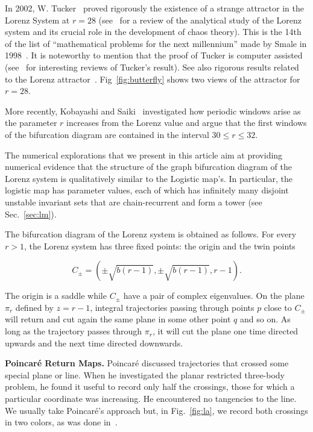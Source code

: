 \documentclass{article}
\def\rhoo{r}
\def\betaa{b}
\newcommand{\beq}{\begin{linenomath}\begin{equation}} %
\newcommand{\eeq}{\end{equation}\end{linenomath}} %
\begin{document}
In 2002, W. Tucker~\cite{Tuc02} proved  rigorously the existence of a strange attractor in the Lorenz System at $r=28$ (see~\cite{Ghy13} for a review of the analytical study of the Lorenz system and its crucial role in the development of chaos theory). 
This is the 14th of the list of  ``mathematical problems for the next millennium'' made by Smale in 1998~\cite{Sma98}. It is noteworthy to mention that the proof of Tucker is computer assisted (see~\cite{Ste00,Via00} for interesting reviews of Tucker's result).
See also rigorous results related to the Lorenz attractor~\cite{Rue76,Ran78,GW79,Wil79}. 
Fig~\ref{fig:butterfly} shows two views of the attractor for $r=28$.

More recently, Kobayashi and Saiki~\cite{KS10,KS14} investigated how periodic windows arise as the parameter $\rhoo$ increases from the Lorenz value and argue that the first windows of the bifurcation diagram are contained in the interval $30\leq\rhoo\leq32$.


The numerical explorations that we present in this article aim at providing numerical evidence that the structure of the graph bifurcation diagram of the Lorenz system is qualitatively similar to the Logistic map's. 
In particular, the logistic map has parameter values, each of which has infinitely many disjoint unstable invariant sets that are chain-recurrent and form a tower (see Sec.~\ref{sec:lm}). 



The bifurcation diagram of the Lorenz system is obtained as follows. For every $\rhoo>1$, the Lorenz system has three fixed points: the origin and the twin points 
\beq
\label{eq:ss}
C_\pm=\left(\pm\sqrt{\betaa(\rhoo-1)},\pm\sqrt{\betaa(\rhoo-1)},\rhoo-1\right).
\eeq
The origin is a saddle while $C_\pm$ have a pair of complex eigenvalues.
On the plane $\pi_\rhoo$ defined by $z=\rhoo-1$, integral trajectories passing through points $p$ close to $C_\pm$ will return and cut again the same plane in some other point $q$ and so on. 
As long as the trajectory passes through  $\pi_\rhoo$, it will cut the plane one time directed upwards and the next time directed downwards. 

{\bf Poincar\'e Return Maps.} 
Poincar\'e discussed trajectories that crossed some special plane or line.
When he investigated the planar restricted three-body problem, he found it useful to record only half the crossings, those for which a particular coordinate was increasing. 
He encountered no tangencies to the line. 
We usually take Poincar\'e's approach but, in Fig.~\ref{fig:la}, we record both crossings in two colors, as was done in~\cite{SSY17}. 
\end{document}
